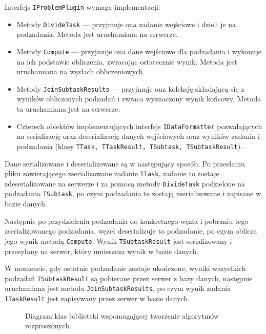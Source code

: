 \documentclass[a4paper,11pt,twoside]{report}
\theoremstyle{definition}
\begin{document}
Interfejs \texttt{IProblemPlugin} wymaga implementacji:
\begin{itemize}
    \item Metody \texttt{DivideTask} --- przyjmuje ona zadanie wejściowe i dzieli je na podzadania. Metoda jest uruchamiana na serwerze.
    \item Metody \texttt{Compute} --- przyjmuje ona dane wejściowe dla podzadania i wykonuje na ich podstawie obliczenia, zwracając ostatecznie wynik. Metoda jest uruchamiana na węzłach obliczeniowych.
    \item Metody \texttt{JoinSubtaskResults} --- przyjmuje ona kolekcję składającą się z wyników obliczonych podzadań i zwraca wyznaczony wynik końcowy. Metoda ta uruchamiana jest na serwerze.
    \item Czterech obiektów implementujących interfejs \texttt{IDataFormatter} pozwalających na serializację oraz deserializację danych wejściowych oraz wyników zadania i podzadania (klasy \texttt{TTask, TTaskResult, TSubtask, TSubtaskResult}).
\end{itemize}

Dane serializowane i deserializowane są w następujący sposób. Po przesłaniu pliku zawierającego zserializowane zadanie \texttt{TTask}, zadanie to zostaje zdeserializowane na serwerze i za pomocą metody \texttt{DivideTask} podzielone na podzadania \texttt{TSubtask}, po czym podzadania te zostają zserializowane i zapisane w bazie danych.

Następnie po przydzieleniu podzadania do konkretnego węzła i pobraniu tego zserializowanego podzadania, węzeł deserializuje to podzadanie, po czym oblicza jego wynik metodą \texttt{Compute}. Wynik \texttt{TSubtaskResult} jest serializowany i przesyłany na serwer, który umieszcza wynik w bazie danych.

W momencie, gdy ostatnie podzadanie zostaje ukończone, wyniki wszystkich podzadań \texttt{TSubtaskResult} są pobierane przez serwer z bazy danych, następnie uruchamiana jest metoda \texttt{JoinSubtaskResults}, po czym wynik zadania \texttt{TTaskResult} jest zapisywany przez serwer w bazie danych.

\begin{figure} 
    \caption{Diagram klas biblioteki wspomagającej tworzenie algorytmów rozproszonych.}
    \label{library-class}
\end{figure}
\end{document}
